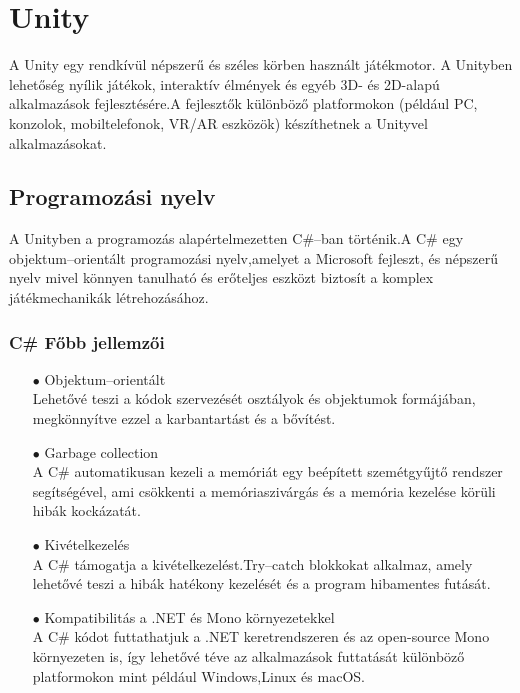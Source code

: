 \documentclass[
]{thesis-ekf}
\theoremstyle{definition}
\theoremstyle{remark}
\begin{document}
\section{Unity}
\label{sec:Unity}
A Unity egy rendkívül népszerű és széles körben használt játékmotor. A Unityben lehetőség nyílik játékok, interaktív élmények és egyéb 3D- és 2D-alapú alkalmazások fejlesztésére.A fejlesztők különböző platformokon (például PC, konzolok, mobiltelefonok, VR/AR eszközök) készíthetnek a Unityvel alkalmazásokat.
\subsection{Programozási nyelv}
A Unityben a programozás alapértelmezetten  C\#--ban történik.A C\# egy objektum--orientált programozási nyelv,amelyet a Microsoft fejleszt, és népszerű nyelv mivel könnyen tanulható és erőteljes eszközt biztosít a komplex játékmechanikák létrehozásához.\cite{Csharp}
\subsubsection{C\# Főbb jellemzői}
\begin{itemize}
	\item[$\bullet$]Objektum--orientált \\Lehetővé teszi a kódok szervezését osztályok és objektumok formájában, megkönnyítve ezzel a karbantartást és a bővítést.
	\item[$\bullet$]Garbage collection\\A C\# automatikusan kezeli a memóriát egy beépített szemétgyűjtő rendszer segítségével, ami csökkenti a memóriaszivárgás és a memória kezelése körüli hibák kockázatát.
	\item[$\bullet$]Kivételkezelés\\A C\# támogatja a kivételkezelést.Try--catch blokkokat alkalmaz, amely lehetővé teszi a hibák hatékony kezelését és a program hibamentes futását.
	\item[$\bullet$]Kompatibilitás a .NET és Mono környezetekkel\\A C\# kódot futtathatjuk a .NET keretrendszeren és az open-source Mono környezeten is, így lehetővé téve az alkalmazások futtatását különböző platformokon mint például Windows,Linux és macOS.
\end{itemize}
\end{document}
